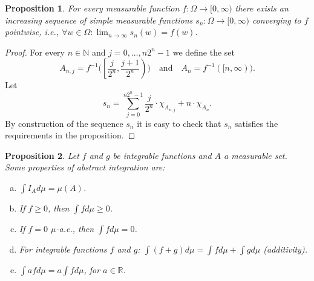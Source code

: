 \documentclass{book}
\theoremstyle{plain}%
\newtheorem{proposition}{Proposition}[section]
\theoremstyle{definition}
\begin{document}
\begin{proposition}
    For every measurable function $f:\Omega \to [0,\infty)$ there exists
    an increasing sequence of simple measurable functions $s_n:\Omega \to [0,\infty)$ converging to $f$ pointwise, i.e., 
    $\displaystyle\forall w\in \Omega\colon \lim_{n\to \infty} s_n(w)=f(w).$\label{prop:dense}
    \end{proposition}

    \begin{proof}
        For every $n\in \mathbb{N}$ and $j=0,\ldots,n2^n-1$ we define the set 
        $$A_{n,j}=
        f^{-1}
        \Big(
        \left[
        \frac{j}{2^n},\frac{j+1}{2^n}
        \right)
        \Big)
        \quad\text{and}\quad
        A_n=f^{-1}([n,\infty)).
        $$
        Let
        $$
        s_n=
        \sum_{j=0}^{n2^n-1} \frac{j}{2^n}\cdot\chi_{A_{n,j}}
        +
        n\cdot \chi_{A_n}.
        $$
        By construction of the sequence $s_n$ it is easy to check that
        $s_n$ satisfies the requirements in the proposition.
\end{proof}

\begin{proposition}

Let $f$ and $g$ be integrable functions and $A$ a measurable set. Some properties of abstract integration are:

\begin{enumerate}[(a)]
\item $\int I_A d\mu = \mu(A)$.
\item If $f \geq 0$, then $\int f d\mu \geq 0$.
\item If $f = 0$ $\mu$-a.e., then $\int f d\mu = 0$.
\item For integrable functions $f$ and $g$: $\int (f + g) d\mu = \int f d\mu + \int g d\mu$ \emph{(additivity)}.
\item $\int afd\mu = a \int fd\mu$, for $a \in \mathbb{R}$.
\end{enumerate}\label{prop:abstract}
\end{proposition}
\end{document}
